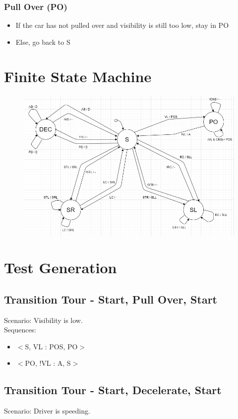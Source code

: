 \documentclass[10pt,letterpaper]{article}
\begin{document}
\subsubsection{Pull Over (PO)}
\begin{itemize}
	\item{If the car has not pulled over and visibility is still too low, stay in PO}
	\item{Else, go back to S}
\end{itemize}

\newpage
\section{Finite State Machine}
\begin{figure}[h]
	\centerline{\includegraphics[width=20cm]{fsm.png}}
\end{figure}

\newpage
\section{Test Generation}
\subsection{Transition Tour - Start, Pull Over, Start}
Scenario: Visibility is low.\\

Sequences:
\begin{itemize}
	\item{$<$S, VL : POS, PO$>$}
	\item{$<$PO, !VL : A, S$>$}
\end{itemize}

\subsection{Transition Tour - Start, Decelerate, Start}
Scenario: Driver is speeding.\\
\end{document}
